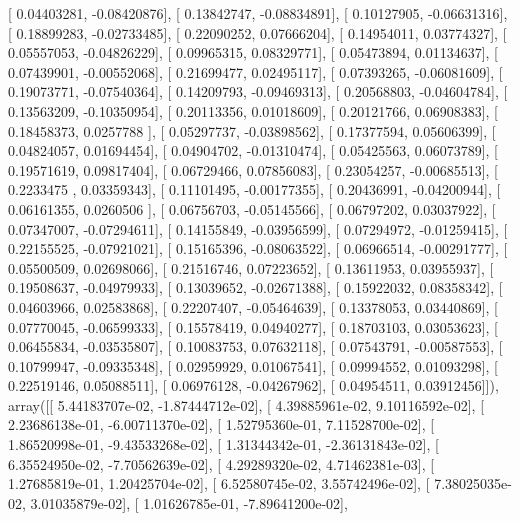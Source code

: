 \documentclass{article}
\begin{document}
       [ 0.04403281, -0.08420876],
       [ 0.13842747, -0.08834891],
       [ 0.10127905, -0.06631316],
       [ 0.18899283, -0.02733485],
       [ 0.22090252,  0.07666204],
       [ 0.14954011,  0.03774327],
       [ 0.05557053, -0.04826229],
       [ 0.09965315,  0.08329771],
       [ 0.05473894,  0.01134637],
       [ 0.07439901, -0.00552068],
       [ 0.21699477,  0.02495117],
       [ 0.07393265, -0.06081609],
       [ 0.19073771, -0.07540364],
       [ 0.14209793, -0.09469313],
       [ 0.20568803, -0.04604784],
       [ 0.13563209, -0.10350954],
       [ 0.20113356,  0.01018609],
       [ 0.20121766,  0.06908383],
       [ 0.18458373,  0.0257788 ],
       [ 0.05297737, -0.03898562],
       [ 0.17377594,  0.05606399],
       [ 0.04824057,  0.01694454],
       [ 0.04904702, -0.01310474],
       [ 0.05425563,  0.06073789],
       [ 0.19571619,  0.09817404],
       [ 0.06729466,  0.07856083],
       [ 0.23054257, -0.00685513],
       [ 0.2233475 ,  0.03359343],
       [ 0.11101495, -0.00177355],
       [ 0.20436991, -0.04200944],
       [ 0.06161355,  0.0260506 ],
       [ 0.06756703, -0.05145566],
       [ 0.06797202,  0.03037922],
       [ 0.07347007, -0.07294611],
       [ 0.14155849, -0.03956599],
       [ 0.07294972, -0.01259415],
       [ 0.22155525, -0.07921021],
       [ 0.15165396, -0.08063522],
       [ 0.06966514, -0.00291777],
       [ 0.05500509,  0.02698066],
       [ 0.21516746,  0.07223652],
       [ 0.13611953,  0.03955937],
       [ 0.19508637, -0.04979933],
       [ 0.13039652, -0.02671388],
       [ 0.15922032,  0.08358342],
       [ 0.04603966,  0.02583868],
       [ 0.22207407, -0.05464639],
       [ 0.13378053,  0.03440869],
       [ 0.07770045, -0.06599333],
       [ 0.15578419,  0.04940277],
       [ 0.18703103,  0.03053623],
       [ 0.06455834, -0.03535807],
       [ 0.10083753,  0.07632118],
       [ 0.07543791, -0.00587553],
       [ 0.10799947, -0.09335348],
       [ 0.02959929,  0.01067541],
       [ 0.09994552,  0.01093298],
       [ 0.22519146,  0.05088511],
       [ 0.06976128, -0.04267962],
       [ 0.04954511,  0.03912456]]), array([[  5.44183707e-02,  -1.87444712e-02],
       [  4.39885961e-02,   9.10116592e-02],
       [  2.23686138e-01,  -6.00711370e-02],
       [  1.52795360e-01,   7.11528700e-02],
       [  1.86520998e-01,  -9.43533268e-02],
       [  1.31344342e-01,  -2.36131843e-02],
       [  6.35524950e-02,  -7.70562639e-02],
       [  4.29289320e-02,   4.71462381e-03],
       [  1.27685819e-01,   1.20425704e-02],
       [  6.52580745e-02,   3.55742496e-02],
       [  7.38025035e-02,   3.01035879e-02],
       [  1.01626785e-01,  -7.89641200e-02],
\end{document}
